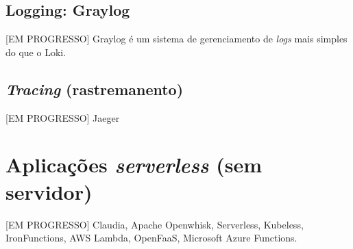 \subsection{Logging: Graylog}
[EM PROGRESSO]  Graylog é um sistema de gerenciamento de \emph{logs} mais simples do que o Loki.

\subsection{\emph{Tracing} (rastremanento)}
[EM PROGRESSO] Jaeger 
  







\section{Aplicações \emph{serverless} (sem servidor)}
[EM PROGRESSO]  Claudia, Apache Openwhisk, Serverless, Kubeless, IronFunctions, AWS Lambda, OpenFaaS, Microsoft Azure Functions.

